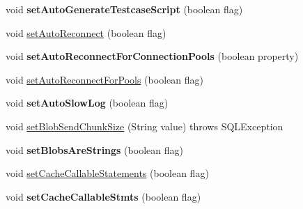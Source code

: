 \begin{DoxyCompactItemize}
\item 
\mbox{\label{classcom_1_1mysql_1_1jdbc_1_1jdbc2_1_1optional_1_1_connection_wrapper_a0d578e2448c74645c9950bff58e04613}} 
void {\bfseries set\+Auto\+Generate\+Testcase\+Script} (boolean flag)
\item 
void \mbox{\hyperlink{classcom_1_1mysql_1_1jdbc_1_1jdbc2_1_1optional_1_1_connection_wrapper_ab60e87c0bf38561dcfae0c6a3524ef27}{set\+Auto\+Reconnect}} (boolean flag)
\item 
\mbox{\label{classcom_1_1mysql_1_1jdbc_1_1jdbc2_1_1optional_1_1_connection_wrapper_aba4b0ca664b4f0bd568a8fc8ff409111}} 
void {\bfseries set\+Auto\+Reconnect\+For\+Connection\+Pools} (boolean property)
\item 
void \mbox{\hyperlink{classcom_1_1mysql_1_1jdbc_1_1jdbc2_1_1optional_1_1_connection_wrapper_ae86cd6b7f7098459fecb312efd62181d}{set\+Auto\+Reconnect\+For\+Pools}} (boolean flag)
\item 
\mbox{\label{classcom_1_1mysql_1_1jdbc_1_1jdbc2_1_1optional_1_1_connection_wrapper_a117471bb3105accb647cc38de9df8628}} 
void {\bfseries set\+Auto\+Slow\+Log} (boolean flag)
\item 
void \mbox{\hyperlink{classcom_1_1mysql_1_1jdbc_1_1jdbc2_1_1optional_1_1_connection_wrapper_ad2a5eec9a52c3c5a68de2bc6af8f333e}{set\+Blob\+Send\+Chunk\+Size}} (String value)  throws S\+Q\+L\+Exception 
\item 
\mbox{\label{classcom_1_1mysql_1_1jdbc_1_1jdbc2_1_1optional_1_1_connection_wrapper_aa22cd06c94eb89690b3bf800897938be}} 
void {\bfseries set\+Blobs\+Are\+Strings} (boolean flag)
\item 
void \mbox{\hyperlink{classcom_1_1mysql_1_1jdbc_1_1jdbc2_1_1optional_1_1_connection_wrapper_a0f60cd752383652f21a16f404ee107c2}{set\+Cache\+Callable\+Statements}} (boolean flag)
\item 
\mbox{\label{classcom_1_1mysql_1_1jdbc_1_1jdbc2_1_1optional_1_1_connection_wrapper_a76c8267a7c7d7a1f92d1057952774411}} 
void {\bfseries set\+Cache\+Callable\+Stmts} (boolean flag)

\end{DoxyCompactItemize}
